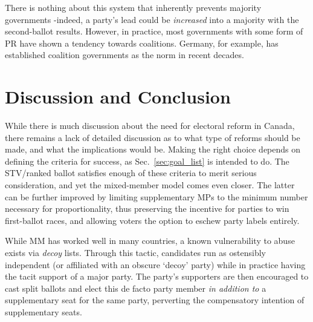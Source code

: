 There is nothing about this system that inherently prevents majority governments \--indeed, a party's lead could be \emph{increased} into a majority with the second-ballot results. However, in practice, most governments with some form of PR have shown a tendency towards coalitions. Germany, for example, has established coalition governments as the norm in recent decades.

\section{Discussion and Conclusion}	

While there is much discussion about the need for electoral reform in Canada, there remains a lack of detailed discussion as to what type of reforms should be made, and what the implications would be. 
Making the right choice depends on defining the criteria for success, as Sec.~\ref{sec:goal_list} is intended to do.  
The STV/ranked ballot satisfies enough of these criteria to merit serious consideration, and yet the mixed-member model comes even closer. 
The latter can be further improved by limiting supplementary MPs to the minimum number necessary for proportionality, thus preserving the incentive for parties to win first-ballot races, and allowing voters the option to eschew party labels entirely.

%
While MM has worked well in many countries, a known vulnerability to abuse exists via \emph{decoy} lists. 
Through this tactic, candidates run as ostensibly independent (or affiliated with an obscure `decoy' party) while in practice having the tacit support of a major party.
The party's supporters are then encouraged to cast split ballots and elect this de facto party member \emph{in addition to} a supplementary seat for the same party, perverting the compensatory intention of supplementary seats.

